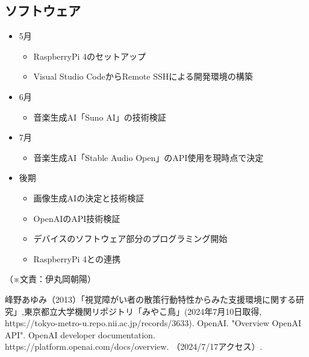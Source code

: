 \documentclass[11pt,a4paper]{report}
\newcommand{\Writer}[1]{
  \normalsize
  \begin{flushright}
    （※文責：#1）
  \end{flushright}
}
\begin{document}
\subsection{ソフトウェア}
\noindent\space
\begin{itemize}
  \item 5月
  \begin{itemize}
    \item RaspberryPi 4のセットアップ
    \item Visual Studio CodeからRemote SSHによる開発環境の構築
  \end{itemize}
  \item 6月
  \begin{itemize}
    \item 音楽生成AI「Suno AI」の技術検証 
  \end{itemize}
  \item 7月
  \begin{itemize}
    \item 音楽生成AI「Stable Audio Open」のAPI使用を現時点で決定
  \end{itemize}
  \item 後期
  \begin{itemize}
    \item 画像生成AIの決定と技術検証
    \item OpenAIのAPI技術検証
    \item デバイスのソフトウェア部分のプログラミング開始
    \item RaspberryPi 4との連携
  \end{itemize}
\end{itemize}
\Writer{伊丸岡朝陽}

\newpage
{}
\begin{thebibliography}{2}
   峰野あゆみ（2013）「視覚障がい者の散策行動特性からみた支援環境に関する研究」,東京都立大学機関リポジトリ「みやこ鳥」(2024年7月10日取得, https://tokyo-metro-u.repo.nii.ac.jp/records/3633).
   OpenAI. "Overview OpenAI API". OpenAI developer documentation. https://platform.openai.com/docs/overview. （2024/7/17アクセス）.
\end{thebibliography}
\end{document}
